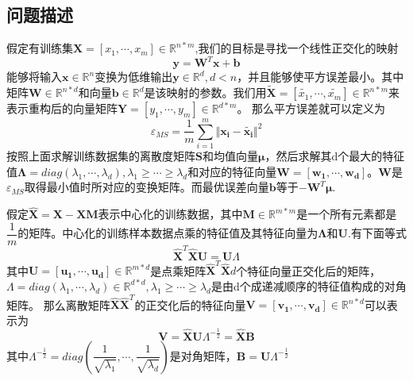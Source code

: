 \documentclass[12pt,a4paper,CJK]{beamer}
\begin{document}
\begin{CJK*}{UTF8}{gkai}
\subsection{问题描述}
\begin{frame}{\subsecname}
假定有训练集$\mathbf{X}=[x_1,\cdots,x_m]\in \mathbb{R}^{n*m}$,我们的目标是寻找一个线性正交化的映射
\begin{equation}
\label{map}
\boldsymbol{y}=\mathbf{W}^T\boldsymbol{x}+\boldsymbol{b}
\end{equation}
能够将输入$\boldsymbol{x} \in \mathbb{R}^n$变换为低维输出$\boldsymbol{y} \in \mathbb{R}^d,d<n$，并且能够使平方误差最小。其中矩阵$\mathbf{W} \in \mathbb{R}^{n*d}$和向量$\boldsymbol{b} \in  \mathbb{R}^d$是该映射的参数。我们用$\tilde{\mathbf{X}}=[\tilde{x_1},\cdots,\tilde{x_m}]\in \mathbb{R}^{n*m}$来表示重构后的向量矩阵$\mathbf{Y}=[y_1,\cdots,y_m]\in \mathbb{R}^{d*m}$。
那么平方误差就可以定义为
\begin{equation}
\varepsilon_{MS}=\frac{1}{m}\sum_{i=1}^{m}\Vert \boldsymbol{x_i}-\tilde{\boldsymbol{x_i}} \Vert^2
\end{equation}
按照上面求解训练数据集的离散度矩阵$\mathbf{S}$和均值向量$\boldsymbol{\mu}$，然后求解其d个最大的特征值$\mathbf{\Lambda}=diag(\lambda_1,\cdots,\lambda_d),\lambda_1\geqslant\cdots\geqslant\lambda_d$和对应的特征向量$\mathbf{W}=[\boldsymbol{w_1},\cdots,\boldsymbol{w_{d}}]$。$\mathbf{W}$是$\varepsilon_{MS}$取得最小值时所对应的变换矩阵。而最优误差向量$\boldsymbol{b}$等于$-\mathbf{W}^T\boldsymbol{\mu}$.
\end{frame}


\begin{frame}{\subsecname}
假定$\hat{\mathbf{X}}=\mathbf{X}-\mathbf{X}\mathbf{M}$表示中心化的训练数据，其中$\mathbf{M} \in \mathbb{R}^{m*m}$是一个所有元素都是$\dfrac{1}{m}$的矩阵。中心化的训练样本数据点乘的特征值及其特征向量为$\mathbf{\Lambda}$和$\mathbf{U}$.有下面等式
\begin{equation}
\hat{\mathbf{X}}^T\hat{\mathbf{X}}\mathbf{U}=\mathbf{U}\Lambda
\end{equation}
其中$\mathbf{U}=[\boldsymbol{u_1},\cdots,\boldsymbol{u_d}] \in \mathbb{R}^{m*d}$是点乘矩阵$\hat{\mathbf{X}}^T\hat{\mathbf{X}}d$个特征向量正交化后的矩阵，$\Lambda=diag(\lambda_1,\cdots,\lambda_d) \in \mathbb{R}^{d*d},\lambda_1\geqslant\cdots\geqslant\lambda_d$是由d个成递减顺序的特征值构成的对角矩阵。
那么离散矩阵$\hat{\mathbf{X}}\hat{\mathbf{X}}^T$的正交化后的特征向量$\mathbf{V}=[\boldsymbol{v_1},\cdots,\boldsymbol{v_d}] \in \mathbb{R}^{n*d}$可以表示为
\begin{equation}
\label{scatter}
\mathbf{V}=\hat{\mathbf{X}}\mathbf{U}\Lambda^{-\frac{1}{2}}=\hat{\mathbf{X}}\mathbf{B}
\end{equation}
其中$\Lambda^{-\frac{1}{2}}=diag(\dfrac{1}{\sqrt{\lambda_1}},\cdots,\dfrac{1}{\sqrt{\lambda_d}})$是对角矩阵，$\mathbf{B}=\mathbf{U}\Lambda^{-\frac{1}{2}}$



\end{frame}
\end{CJK*}
\end{document}
